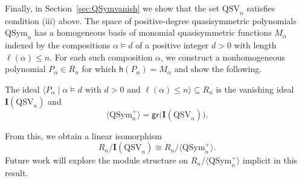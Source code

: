 \documentclass[12pt]{amsart}
\theoremstyle{definition}
\theoremstyle{remark}
\numberwithin{equation}{section}
\newenvironment{introthm}[1]{
  \renewcommand\theequation{#1}
  \thm
}{\endthm}
\newcommand{\QSym}{\mathrm{QSym}}
\newcommand{\QSV}{\mathrm{QSV}}
\begin{document}
Finally, in Section~\ref{sec:QSymvanish} we show that the set $\QSV_{n}$ satisfies condition (iii) above.  
The space of positive-degree quasisymmetric polynomials $\QSym_{n}$ has a homogeneous basis of monomial quasisymmetric functions $M_{\alpha}$ indexed by the compositions $\alpha \vDash d$ of a positive integer $d > 0$ with length $\ell(\alpha) \le n$.  
For each such composition $\alpha$, we construct a nonhomogeneous polynomial $P_{\alpha} \in R_{n}$ for which $\mathsf{h}(P_{\alpha}) = M_{\alpha}$ and show the following.

\begin{introthm}{\ref{thm:vanishingQSV}}
The ideal $\langle P_{\alpha} \;|\; \text{$\alpha \vDash d $ with $d> 0$ and $\ell(\alpha) \le n$} \rangle \subseteq R_n$ is the vanishing ideal $\mathbf{I}(\QSV_n)$ and 
\[
 \langle \QSym_{n}^{+} \rangle = \mathsf{gr}\big(\mathbf{I}(\QSV_{n})\big).
\]
\end{introthm}

From this, we obtain a linear isomorphism
\[
R_{n}/\mathbf{I}(\QSV_{n}) \cong R_{n}/\langle \QSym_{n}^{+} \rangle.
\]
Future work will explore the module structure on $R_{n}/\langle \QSym_{n}^{+} \rangle$ implicit in this result.
\end{document}
